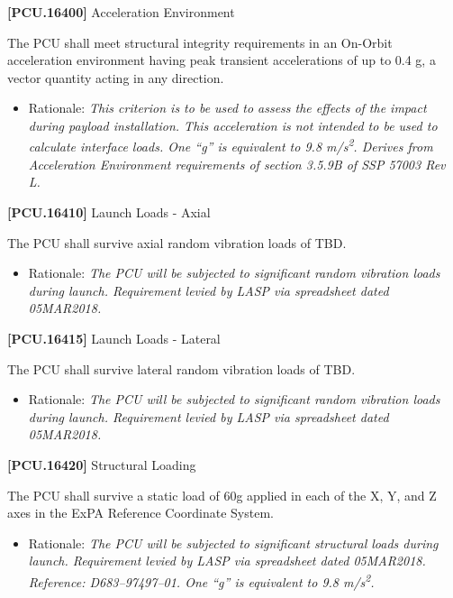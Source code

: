 \documentclass[12pt,oneside,oldfontcommands]{memoir}
\begin{document}
\textbf{[PCU.16400]} Acceleration Environment

The \gls{PCU} shall meet structural integrity requirements in an On-Orbit acceleration environment having peak transient accelerations of up to 0.4 g, a vector quantity acting in any direction.

\begin{itemize}
\item{} Rationale: \emph{This criterion is to be used to assess the effects of the impact during payload installation. This acceleration is not intended to be used to calculate interface loads. One ``g'' is equivalent to 9.8 m\slash s\textsuperscript{2}. Derives from Acceleration Environment requirements of section 3.5.9B of SSP 57003 Rev L.}

\end{itemize}

\textbf{[PCU.16410]} Launch Loads - Axial

The \gls{PCU} shall survive axial random vibration loads of TBD\label{tbx_11}.

\begin{itemize}
\item{} Rationale: \emph{The PCU will be subjected to significant random vibration loads during launch. Requirement levied by LASP via spreadsheet dated 05MAR2018.}

\end{itemize}

\textbf{[PCU.16415]} Launch Loads - Lateral

The \gls{PCU} shall survive lateral random vibration loads of TBD\label{tbx_12}.

\begin{itemize}
\item{} Rationale: \emph{The PCU will be subjected to significant random vibration loads during launch. Requirement levied by LASP via spreadsheet dated 05MAR2018.}

\end{itemize}

\textbf{[PCU.16420]} Structural Loading

The \gls{PCU} shall survive a static load of 60g applied in each of the X, Y, and Z axes in the \gls{ExPA} Reference Coordinate System.

\begin{itemize}
\item{} Rationale: \emph{The PCU will be subjected to significant structural loads during launch. Requirement levied by LASP via spreadsheet dated 05MAR2018. Reference: D683--97497--01. One ``g'' is equivalent to 9.8 m\slash s\textsuperscript{2}.}

\end{itemize}
\end{document}
